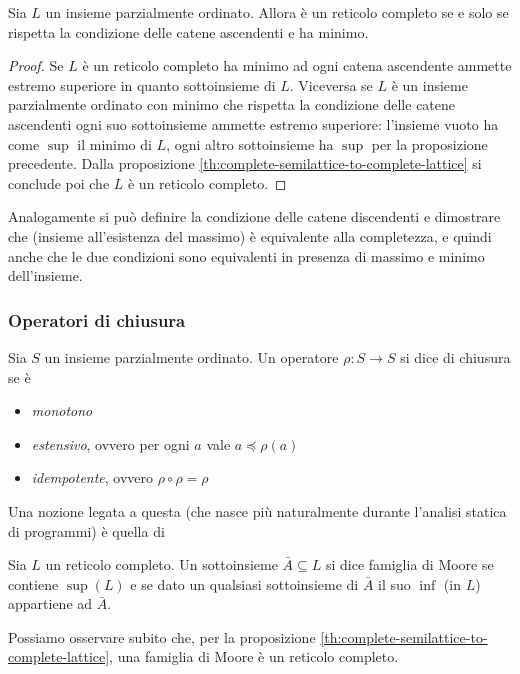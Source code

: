 \documentclass[12pt]{article}
\numberwithin{theorem}{subsection}
\begin{document}
\begin{corollary}
	Sia $L$ un insieme parzialmente ordinato. Allora è un reticolo completo se e solo se rispetta la condizione delle catene ascendenti e ha minimo.
\end{corollary}
\begin{proof}
	Se $L$ è un reticolo completo ha minimo ad ogni catena ascendente ammette estremo superiore in quanto sottoinsieme di $L$.
	Viceversa se $L$ è un insieme parzialmente ordinato con minimo che rispetta la condizione delle catene ascendenti ogni suo sottoinsieme ammette estremo superiore: l'insieme vuoto ha come $\sup$ il minimo di $L$, ogni altro sottoinsieme ha $\sup$ per la proposizione precedente. Dalla proposizione \ref{th:complete-semilattice-to-complete-lattice} si conclude poi che $L$ è un reticolo completo.
\end{proof}

Analogamente si può definire la condizione delle catene discendenti e dimostrare che (insieme all'esistenza del massimo) è equivalente alla completezza, e quindi anche che le due condizioni sono equivalenti in presenza di massimo e minimo dell'insieme.

\subsubsection{Operatori di chiusura}
\begin{definition}
	Sia $S$ un insieme parzialmente ordinato. Un operatore $\rho : S \rightarrow S$ si dice di chiusura se è
	\begin{itemize}
		\item \textit{monotono}
		\item \textit{estensivo}, ovvero per ogni $a$ vale $a \preceq \rho(a)$
		\item \textit{idempotente}, ovvero $\rho \circ \rho = \rho$
	\end{itemize}
\end{definition}

Una nozione legata a questa (che nasce più naturalmente durante l'analisi statica di programmi) è quella di
\begin{definition}
	Sia $L$ un reticolo completo. Un sottoinsieme $\bar{A} \subseteq L$ si dice famiglia di Moore se contiene $\sup(L)$ e se dato un qualsiasi sottoinsieme di $\bar{A}$ il suo $\inf$ (in $L$) appartiene ad $\bar{A}$.
\end{definition}

Possiamo osservare subito che, per la proposizione \ref{th:complete-semilattice-to-complete-lattice}, una famiglia di Moore è un reticolo completo.
\end{document}
